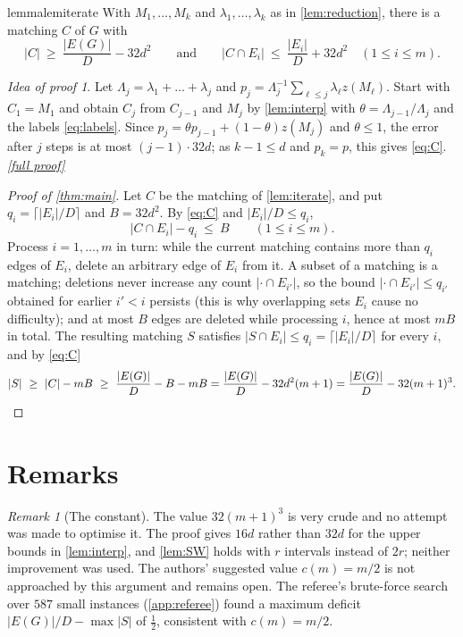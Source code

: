 \documentclass[11pt,a4paper]{article}
\theoremstyle{plain}
\theoremstyle{definition}
\theoremstyle{remark}
\newtheorem{remark}[theorem]{Remark}
\newtheorem*{proofidea}{Idea of proof}
\newcommand{\fullproofref}[1]{\,\hyperref[#1]{\textit{[full proof]}}}
\begin{document}
\begin{restatable}{lemma}{lemiterate}\label{lem:iterate}
With $M_1,\dots,M_k$ and $\lambda_1,\dots,\lambda_k$ as in \cref{lem:reduction}, there is a matching $C$ of $G$ with
\begin{equation}\label{eq:C}
 |C|\ \ge\ \frac{|E(G)|}{D}-32d^2
 \qquad\text{and}\qquad
 |C\cap E_i|\ \le\ \frac{|E_i|}{D}+32d^2\quad(1\le i\le m).
\end{equation}
\end{restatable}
\begin{proofidea}
Let $\Lambda_j=\lambda_1+\dots+\lambda_j$ and $p_j=\Lambda_j^{-1}\sum_{\ell\le j}\lambda_\ell z(M_\ell)$. Start with $C_1=M_1$ and obtain $C_j$ from $C_{j-1}$ and $M_j$ by \cref{lem:interp} with $\theta=\Lambda_{j-1}/\Lambda_j$ and the labels \eqref{eq:labels}. Since $p_j=\theta p_{j-1}+(1-\theta)z(M_j)$ and $\theta\le1$, the error after $j$ steps is at most $(j-1)\cdot32d$; as $k-1\le d$ and $p_k=p$, this gives \eqref{eq:C}.\fullproofref{pf:iterate}
\end{proofidea}

\begin{proof}[Proof of \cref{thm:main}]
Let $C$ be the matching of \cref{lem:iterate}, and put $q_i=\lceil|E_i|/D\rceil$ and $B=32d^2$. By \eqref{eq:C} and $|E_i|/D\le q_i$,
\[
 |C\cap E_i|-q_i\ \le\ B\qquad(1\le i\le m).
\]
Process $i=1,\dots,m$ in turn: while the current matching contains more than $q_i$ edges of $E_i$, delete an arbitrary edge of $E_i$ from it. A subset of a matching is a matching; deletions never increase any count $|\cdot\cap E_{i'}|$, so the bound $|\cdot\cap E_{i'}|\le q_{i'}$ obtained for earlier $i'<i$ persists (this is why overlapping sets $E_i$ cause no difficulty); and at most $B$ edges are deleted while processing $i$, hence at most $mB$ in total. The resulting matching $S$ satisfies $|S\cap E_i|\le q_i=\lceil|E_i|/D\rceil$ for every $i$, and by \eqref{eq:C}
\[
 |S|\ \ge\ |C|-mB\ \ge\ \frac{|E(G)|}{D}-B-mB=\frac{|E(G)|}{D}-32d^2(m+1)=\frac{|E(G)|}{D}-32(m+1)^3 .
\qedhere
\]
\end{proof}

\section{Remarks}\label{sec:remarks}

\begin{remark}[The constant]\label{rem:constant}
The value $32(m+1)^3$ is very crude and no attempt was made to optimise it. The proof gives $16d$ rather than $32d$ for the upper bounds in \cref{lem:interp}, and \cref{lem:SW} holds with $r$ intervals instead of $2r$; neither improvement was used. The authors' suggested value $c(m)=m/2$ \cite{AABCKLZ} is not approached by this argument and remains open. The referee's brute-force search over $587$ small instances (\cref{app:referee}) found a maximum deficit $|E(G)|/D-\max|S|$ of $\frac12$, consistent with $c(m)=m/2$.
\end{remark}
\end{document}
